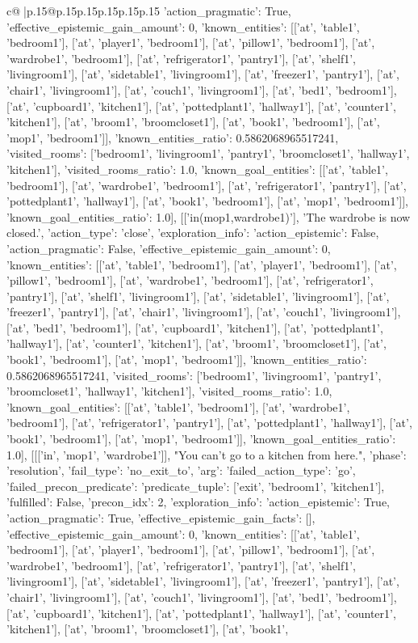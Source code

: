 \documentclass{article}
\begin{document}
{\begin{supertabular}{c@{$\;$}|p{.15\linewidth}@{}p{.15\linewidth}p{.15\linewidth}p{.15\linewidth}p{.15\linewidth}p{.15\linewidth}}
{{{'action_pragmatic': True, 'effective_epistemic_gain_amount': 0, 'known_entities': [['at', 'table1', 'bedroom1'], ['at', 'player1', 'bedroom1'], ['at', 'pillow1', 'bedroom1'], ['at', 'wardrobe1', 'bedroom1'], ['at', 'refrigerator1', 'pantry1'], ['at', 'shelf1', 'livingroom1'], ['at', 'sidetable1', 'livingroom1'], ['at', 'freezer1', 'pantry1'], ['at', 'chair1', 'livingroom1'], ['at', 'couch1', 'livingroom1'], ['at', 'bed1', 'bedroom1'], ['at', 'cupboard1', 'kitchen1'], ['at', 'pottedplant1', 'hallway1'], ['at', 'counter1', 'kitchen1'], ['at', 'broom1', 'broomcloset1'], ['at', 'book1', 'bedroom1'], ['at', 'mop1', 'bedroom1']], 'known_entities_ratio': 0.5862068965517241, 'visited_rooms': ['bedroom1', 'livingroom1', 'pantry1', 'broomcloset1', 'hallway1', 'kitchen1'], 'visited_rooms_ratio': 1.0, 'known_goal_entities': [['at', 'table1', 'bedroom1'], ['at', 'wardrobe1', 'bedroom1'], ['at', 'refrigerator1', 'pantry1'], ['at', 'pottedplant1', 'hallway1'], ['at', 'book1', 'bedroom1'], ['at', 'mop1', 'bedroom1']], 'known_goal_entities_ratio': 1.0}}], [['in(mop1,wardrobe1)'], 'The wardrobe is now closed.', {'action_type': 'close', 'exploration_info': {'action_epistemic': False, 'action_pragmatic': False, 'effective_epistemic_gain_amount': 0, 'known_entities': [['at', 'table1', 'bedroom1'], ['at', 'player1', 'bedroom1'], ['at', 'pillow1', 'bedroom1'], ['at', 'wardrobe1', 'bedroom1'], ['at', 'refrigerator1', 'pantry1'], ['at', 'shelf1', 'livingroom1'], ['at', 'sidetable1', 'livingroom1'], ['at', 'freezer1', 'pantry1'], ['at', 'chair1', 'livingroom1'], ['at', 'couch1', 'livingroom1'], ['at', 'bed1', 'bedroom1'], ['at', 'cupboard1', 'kitchen1'], ['at', 'pottedplant1', 'hallway1'], ['at', 'counter1', 'kitchen1'], ['at', 'broom1', 'broomcloset1'], ['at', 'book1', 'bedroom1'], ['at', 'mop1', 'bedroom1']], 'known_entities_ratio': 0.5862068965517241, 'visited_rooms': ['bedroom1', 'livingroom1', 'pantry1', 'broomcloset1', 'hallway1', 'kitchen1'], 'visited_rooms_ratio': 1.0, 'known_goal_entities': [['at', 'table1', 'bedroom1'], ['at', 'wardrobe1', 'bedroom1'], ['at', 'refrigerator1', 'pantry1'], ['at', 'pottedplant1', 'hallway1'], ['at', 'book1', 'bedroom1'], ['at', 'mop1', 'bedroom1']], 'known_goal_entities_ratio': 1.0}}], [[['in', 'mop1', 'wardrobe1']], "You can't go to a kitchen from here.", {'phase': 'resolution', 'fail_type': 'no_exit_to', 'arg': {'failed_action_type': 'go', 'failed_precon_predicate': {'predicate_tuple': ['exit', 'bedroom1', 'kitchen1'], 'fulfilled': False, 'precon_idx': 2}}, 'exploration_info': {'action_epistemic': True, 'action_pragmatic': True, 'effective_epistemic_gain_facts': [], 'effective_epistemic_gain_amount': 0, 'known_entities': [['at', 'table1', 'bedroom1'], ['at', 'player1', 'bedroom1'], ['at', 'pillow1', 'bedroom1'], ['at', 'wardrobe1', 'bedroom1'], ['at', 'refrigerator1', 'pantry1'], ['at', 'shelf1', 'livingroom1'], ['at', 'sidetable1', 'livingroom1'], ['at', 'freezer1', 'pantry1'], ['at', 'chair1', 'livingroom1'], ['at', 'couch1', 'livingroom1'], ['at', 'bed1', 'bedroom1'], ['at', 'cupboard1', 'kitchen1'], ['at', 'pottedplant1', 'hallway1'], ['at', 'counter1', 'kitchen1'], ['at', 'broom1', 'broomcloset1'], ['at', 'book1', }}}
\end{supertabular}}
\end{document}
